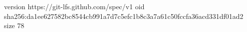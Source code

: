 version https://git-lfs.github.com/spec/v1
oid sha256:da1ee627582bc8544cb991a7d7c5efc1b8c3a7a61c50fccfa36acd331df01ad2
size 78
